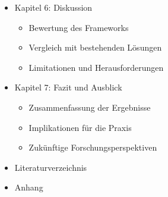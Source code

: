 \begin{itemize}
\begin{itemize}
      \end{itemize}
  \item Kapitel 6: Diskussion
      \begin{itemize}
          \item Bewertung des Frameworks
          \item Vergleich mit bestehenden Lösungen
          \item Limitationen und Herausforderungen
      \end{itemize}
  \item Kapitel 7: Fazit und Ausblick
      \begin{itemize}
          \item Zusammenfassung der Ergebnisse
          \item Implikationen für die Praxis
          \item Zukünftige Forschungsperspektiven
      \end{itemize}
  \item Literaturverzeichnis
  \item Anhang
\end{itemize}